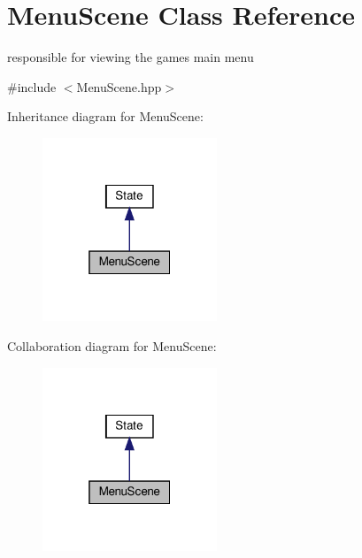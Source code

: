 \hypertarget{classMenuScene}{}\section{Menu\+Scene Class Reference}
\label{classMenuScene}


responsible for viewing the game\textquotesingle{}s main menu  




{\ttfamily \#include $<$Menu\+Scene.\+hpp$>$}



Inheritance diagram for Menu\+Scene\+:
\nopagebreak
\begin{figure}[H]
\begin{center}
\leavevmode
\includegraphics[width=148pt]{classMenuScene__inherit__graph}
\end{center}
\end{figure}


Collaboration diagram for Menu\+Scene\+:
\nopagebreak
\begin{figure}[H]
\begin{center}
\leavevmode
\includegraphics[width=148pt]{classMenuScene__coll__graph}
\end{center}
\end{figure}
